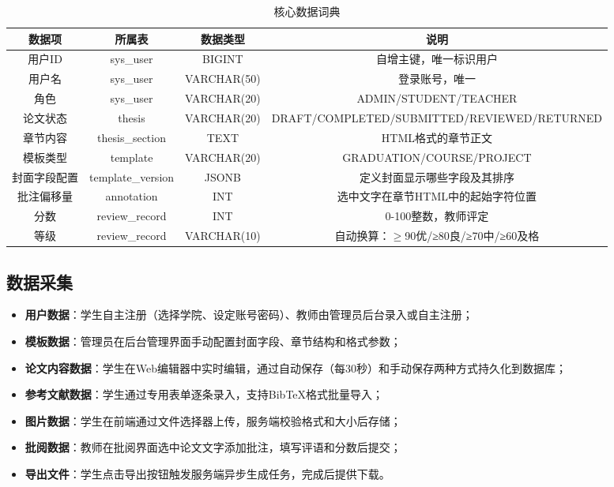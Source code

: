 \begin{table}[htbp]
    \centering
    \caption{核心数据词典}
    \begin{tabular}{|c|c|c|c|}
        \hline
        \textbf{数据项} & \textbf{所属表} & \textbf{数据类型} & \textbf{说明} \\
        \hline
        用户ID & sys\_user & BIGINT & 自增主键，唯一标识用户 \\
        \hline
        用户名 & sys\_user & VARCHAR(50) & 登录账号，唯一 \\
        \hline
        角色 & sys\_user & VARCHAR(20) & ADMIN/STUDENT/TEACHER \\
        \hline
        论文状态 & thesis & VARCHAR(20) & DRAFT/COMPLETED/SUBMITTED/REVIEWED/RETURNED \\
        \hline
        章节内容 & thesis\_section & TEXT & HTML格式的章节正文 \\
        \hline
        模板类型 & template & VARCHAR(20) & GRADUATION/COURSE/PROJECT \\
        \hline
        封面字段配置 & template\_version & JSONB & 定义封面显示哪些字段及其排序 \\
        \hline
        批注偏移量 & annotation & INT & 选中文字在章节HTML中的起始字符位置 \\
        \hline
        分数 & review\_record & INT & 0-100整数，教师评定 \\
        \hline
        等级 & review\_record & VARCHAR(10) & 自动换算：$\geq$90优/≥80良/≥70中/≥60及格 \\
        \hline
    \end{tabular}
\end{table}

\subsection{数据采集}

\begin{itemize}
    \item \textbf{用户数据}：学生自主注册（选择学院、设定账号密码）、教师由管理员后台录入或自主注册；
    \item \textbf{模板数据}：管理员在后台管理界面手动配置封面字段、章节结构和格式参数；
    \item \textbf{论文内容数据}：学生在Web编辑器中实时编辑，通过自动保存（每30秒）和手动保存两种方式持久化到数据库；
    \item \textbf{参考文献数据}：学生通过专用表单逐条录入，支持BibTeX格式批量导入；
    \item \textbf{图片数据}：学生在前端通过文件选择器上传，服务端校验格式和大小后存储；
    \item \textbf{批阅数据}：教师在批阅界面选中论文文字添加批注，填写评语和分数后提交；
    \item \textbf{导出文件}：学生点击导出按钮触发服务端异步生成任务，完成后提供下载。
\end{itemize}
